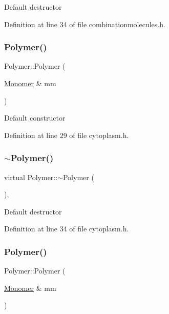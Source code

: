 Default destructor 

Definition at line 34 of file combinationmolecules.\+h.

\mbox{\label{class_polymer_ae77454a3908652e4df6a26b9cac509a5}} 
\subsubsection{\texorpdfstring{Polymer()}{Polymer()}\hspace{0.1cm}{\footnotesize\ttfamily [4/14]}}
{\footnotesize\ttfamily Polymer\+::\+Polymer (\begin{DoxyParamCaption}\item[{\hyperlink{class_monomer}{Monomer} \&}]{mm }\end{DoxyParamCaption})\hspace{0.3cm}{\ttfamily [inline]}}

Default constructor 

Definition at line 29 of file cytoplasm.\+h.

\mbox{\label{class_polymer_aac2b3983f375a5691c7d5ca1a79594d5}} 
\subsubsection{\texorpdfstring{$\sim$\+Polymer()}{~Polymer()}\hspace{0.1cm}{\footnotesize\ttfamily [4/11]}}
{\footnotesize\ttfamily virtual Polymer\+::$\sim$\+Polymer (\begin{DoxyParamCaption}{ }\end{DoxyParamCaption})\hspace{0.3cm}{\ttfamily [inline]}, {\ttfamily [virtual]}}

Default destructor 

Definition at line 34 of file cytoplasm.\+h.

\mbox{\label{class_polymer_ae77454a3908652e4df6a26b9cac509a5}} 
\subsubsection{\texorpdfstring{Polymer()}{Polymer()}\hspace{0.1cm}{\footnotesize\ttfamily [5/14]}}
{\footnotesize\ttfamily Polymer\+::\+Polymer (\begin{DoxyParamCaption}\item[{\hyperlink{class_monomer}{Monomer} \&}]{mm }\end{DoxyParamCaption})\hspace{0.3cm}{\ttfamily [inline]}}

